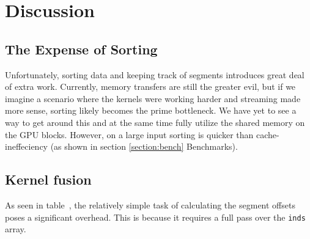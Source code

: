 \documentclass[12pt, a4paper, hidelinks]{article}
\renewcommand{\tt}[1]{\texttt{#1}}
\begin{document}
\section{Discussion}




\subsection{The Expense of Sorting}
Unfortunately, sorting data and keeping track of segments
introduces great deal of extra work. Currently, memory transfers are still the greater evil, but if we imagine a scenario where the kernels were working harder and streaming made more sense, sorting likely becomes the prime bottleneck. We have yet to see a way to get around this and at the same time fully utilize the shared memory on the GPU blocks. However, on a large input sorting is quicker than cache-ineffeciency (as shown in section \ref{section:bench} Benchmarks).

\subsection{Kernel fusion}
As seen in table~, the relatively simple task of calculating the segment offsets
poses a significant overhead. This is because it requires a full pass over the \tt{inds} array.
\end{document}
